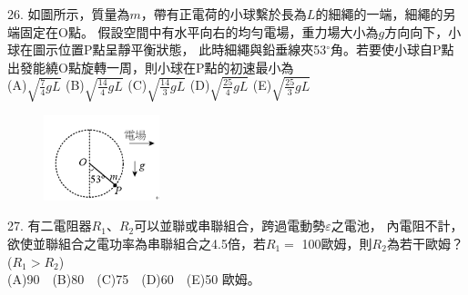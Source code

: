\documentclass[cn,10pt,math=newtx]{elegantbook}
\begin{document}
\newpage


\begin{example}
   26. 如圖所示，質量為$m$，帶有正電荷的小球繫於長為$L$的細繩的一端，細繩的另端固定在O點。
   假設空間中有水平向右的均勻電場，重力場大小為$g$方向向下，小球在圖示位置P點呈靜平衡狀態，
   此時細繩與鉛垂線夾53$^\circ$角。若要使小球自P點出發能繞O點旋轉一周，則小球在P點的初速最小為\\
(A)$\sqrt{\frac{7}{4}gL}$ (B)$\sqrt{\frac{14}{4}gL}$ (C)$\sqrt{\frac{14}{3}gL}$ 
(D)$\sqrt{\frac{25}{4}gL}$ (E)$\sqrt{\frac{25}{3}gL}$
\\
    \rightline{[成德高中教甄109]}
\end{example}
\begin{solution}
    
\end{solution}
\begin{figure}[htbp]
    \flushright
    \includegraphics[width=0.3\textwidth]{image/109成德26.png}
  \end{figure}
\newpage


\begin{example}
   27. 有二電阻器$R_1$、$R_2$可以並聯或串聯組合，跨過電動勢$\varepsilon$之電池，
   內電阻不計，欲使並聯組合之電功率為串聯組合之4.5倍，若$R_1 =$ 100歐姆，則$R_2$為若干歐姆？($R_1 > R_2$)  \\
   (A)90　(B)80　(C)75　(D)60　(E)50  歐姆。\\
    \rightline{[成德高中教甄109]}
\end{example}
\begin{solution}
    
\end{solution}

\newpage
\end{document}
